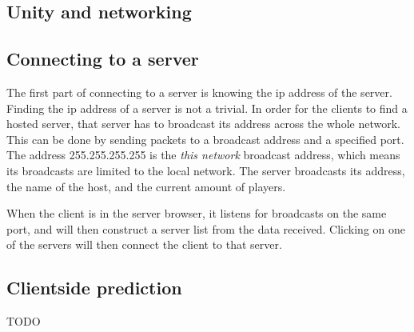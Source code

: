 \subsection{Unity and networking}

\subsection{Connecting to a server}
The first part of connecting to a server is knowing the ip address of the server.
Finding the ip address of a server is not a trivial.
In order for the clients to find a hosted server, that server has to broadcast its address across the whole network.
This can be done by sending packets to a broadcast address and a specified port.
The address 255.255.255.255 is the \textit{this network} broadcast address, which means its broadcasts are limited to the local network.
The server broadcasts its address, the name of the host, and the current amount of players.

When the client is in the server browser, it listens for broadcasts on the same port, and will then construct a server list from the data received.
Clicking on one of the servers will then connect the client to that server.


\subsection{Clientside prediction}
TODO